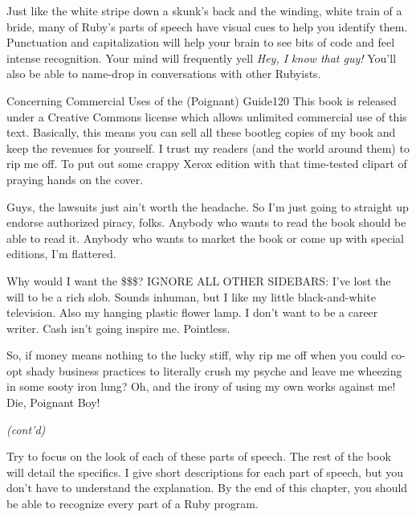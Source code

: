 \documentclass[12pt,twoside]{report}
\begin{document}
Just like the white stripe down a skunk's back and the winding, white
train of a bride, many of Ruby's parts of speech have visual cues to
help you identify them.  Punctuation and capitalization will help your
brain to see bits of code and feel intense recognition. Your mind will
frequently yell {\em Hey, I know that guy!}  You'll also be able to
name-drop in conversations with other Rubyists.

	\begin{sidebar}{Concerning Commercial Uses of the (Poignant) Guide}{120}
		This book is released under a Creative Commons license which allows unlimited commercial use of this text. Basically, this means you can sell all these bootleg copies of my book and keep the revenues for yourself. I trust my readers (and the world around them) to rip me off. To put out some crappy Xerox edition with that time-tested clipart of praying hands on the cover.\vspace{6pt}
		
		Guys, the lawsuits just ain't worth the headache. So I'm just going to straight up endorse authorized piracy, folks. Anybody who wants to read the book should be able to read it. Anybody who wants to market the book or come up with special editions, I'm flattered.\vspace{6pt}
		
		Why would I want the \$\$\$? IGNORE ALL OTHER SIDEBARS: I've lost the will to be a rich slob. Sounds inhuman, but I like my little black-and-white television. Also my hanging plastic flower lamp. I don't want to be a career writer. Cash isn't going inspire me. Pointless.\vspace{6pt}
		
		So, if money means nothing to the lucky stiff, why rip me off when you could co-opt shady business practices to literally crush my psyche and leave me wheezing in some sooty iron lung? Oh, and the irony of using my own works against me! Die, Poignant Boy! \vspace{6pt}
		
		\textit{(cont'd)} \vspace{6pt}
	\end{sidebar}


Try to focus on the look of each of these parts of speech.  The rest
of the book will detail the specifics.  I give short descriptions for
each part of speech, but you don't have to understand the explanation.
By the end of this chapter, you should be able to recognize every part
of a Ruby program.
\end{document}
